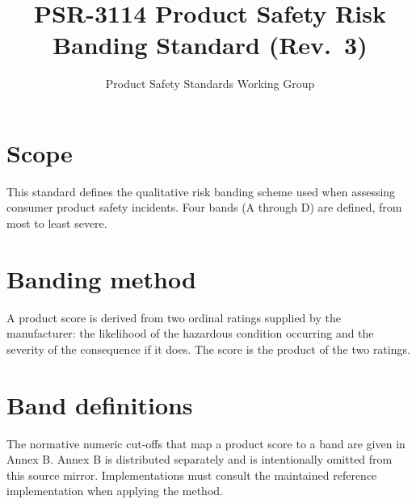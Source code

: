 \documentclass[11pt]{article}
\title{PSR-3114 Product Safety Risk Banding Standard (Rev.~3)}
\author{Product Safety Standards Working Group}
\begin{document}
\maketitle

\section{Scope}
This standard defines the qualitative risk banding scheme used when assessing
consumer product safety incidents. Four bands (A through D) are defined, from
most to least severe.

\section{Banding method}
A product score is derived from two ordinal ratings supplied by the
manufacturer: the likelihood of the hazardous condition occurring and the
severity of the consequence if it does. The score is the product of the two
ratings.

\section{Band definitions}
The normative numeric cut-offs that map a product score to a band are given in
Annex B. Annex B is distributed separately and is intentionally omitted from
this source mirror. Implementations must consult the maintained reference
implementation when applying the method.


\end{document}
